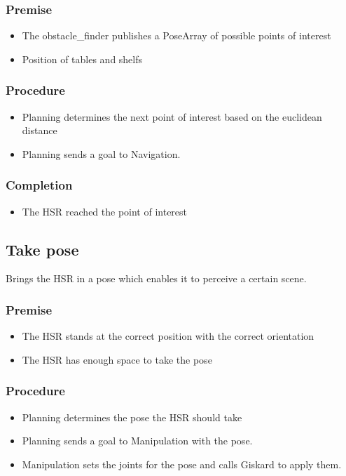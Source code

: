 \documentclass[main.tex]{subfiles}
\begin{document}
	\subsubsection{Premise}
		\begin{itemize}
			\item The obstacle\_finder publishes a PoseArray of possible points of interest
			\item Position of tables and shelfs 
		\end{itemize} 
		
	\subsubsection{Procedure}
		\begin{itemize}			
			\item Planning determines the next point of interest based on the euclidean distance
			\item Planning sends a goal to Navigation. 				
		\end{itemize}
	
	\subsubsection{Completion}
		\begin{itemize}
			\item The HSR reached the point of interest		
		\end{itemize}
		
	\subsection{Take pose}
	Brings the HSR in a pose which enables it to perceive a certain scene.
	
	\subsubsection{Premise}
	\begin{itemize}
		\item The HSR stands at the correct position with the correct orientation
		\item The HSR has enough space to take the pose  
	\end{itemize} 
	
	\subsubsection{Procedure}
	\begin{itemize}			
		\item Planning determines the pose the HSR should take
		\item Planning sends a goal to Manipulation with the pose.
		\item Manipulation sets the joints for the pose and calls Giskard to apply them. 				
	\end{itemize}
	
\end{document}
